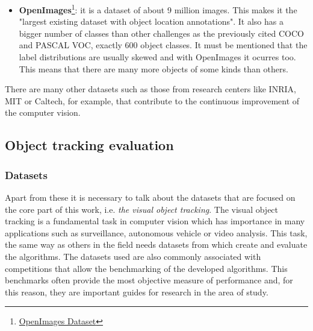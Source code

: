 \documentclass{bmvc2k}
\begin{document}
\begin{itemize}
\item \textbf{OpenImages}\footnote {\href{https://storage.googleapis.com/openimages/web/index.html}{OpenImages Dataset}}: it is a dataset of about 9 million images. This makes it the "largest existing dataset with object location annotations". It also has a bigger number of classes than other challenges as the previously cited COCO and PASCAL VOC, exactly 600 object classes. It must be mentioned that the label distributions are usually skewed and with OpenImages it ocurres too. This means that there are many more objects of some kinds than others.
\end{itemize}
There are many other datasets such as those from research centers like INRIA, MIT or Caltech, for example, that contribute to the continuous improvement of the computer vision.
\subsection{Object tracking evaluation}
\subsubsection{Datasets}
Apart from these it is necessary to talk about the datasets that are focused on the core part of this work, i.e. \textit{the visual object tracking}. The visual object tracking is a fundamental task in computer vision which has importance in many applications such as surveillance, autonomous vehicle or video analysis. This task, the same way as others in the field needs datasets from which create and evaluate the algorithms. The datasets used are also commonly associated with competitions that allow the benchmarking of the developed algorithms. This benchmarks often provide the most objective measure of performance and, for this reason, they are important guides for research in the area of study.
\end{document}
